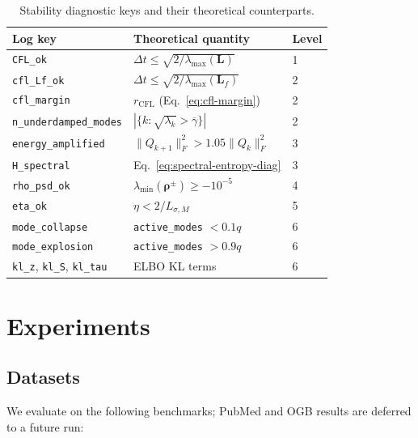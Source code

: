 \documentclass[11pt,a4paper]{article}
\newcommand{\Lmat}{\mathbf{L}}
\begin{document}
\begin{table}[ht]
  \centering
  \caption{Stability diagnostic keys and their theoretical counterparts.}
  \label{tab:stability-keys}
  \begin{tabular}{lll}
    \toprule
    \textbf{Log key} & \textbf{Theoretical quantity} & \textbf{Level} \\
    \midrule
    \texttt{CFL\_ok} & $\Delta t \leq \sqrt{2/\lambda_{\max}(\Lmat)}$ & 1 \\
    \texttt{cfl\_Lf\_ok} & $\Delta t \leq \sqrt{2/\lambda_{\max}(\Lmat_f)}$ & 2 \\
    \texttt{cfl\_margin} & $r_{\mathrm{CFL}}$ (Eq.~\ref{eq:cfl-margin}) & 2 \\
    \texttt{n\_underdamped\_modes} & $|\{k:\sqrt{\lambda_k}>\overline{\gamma}\}|$ & 2 \\
    \texttt{energy\_amplified} & $\|Q_{k+1}\|_F^2 > 1.05\|Q_k\|_F^2$ & 3 \\
    \texttt{H\_spectral} & Eq.~\eqref{eq:spectral-entropy-diag} & 3 \\
    \texttt{rho\_psd\_ok} & $\lambda_{\min}(\boldsymbol{\rho}^\pm) \geq -10^{-5}$ & 4 \\
    \texttt{eta\_ok} & $\eta < 2/L_{\sigma,M}$ & 5 \\
    \texttt{mode\_collapse} & \texttt{active\_modes} $< 0.1q$ & 6 \\
    \texttt{mode\_explosion} & \texttt{active\_modes} $> 0.9q$ & 6 \\
    \texttt{kl\_z}, \texttt{kl\_S}, \texttt{kl\_tau} & ELBO KL terms & 6 \\
    \bottomrule
  \end{tabular}
\end{table}

\section{Experiments}
\label{sec:experiments}

\subsection{Datasets}
\label{sec:experiments:data}

We evaluate on the following benchmarks; PubMed and OGB results are deferred
to a future run:
\end{document}
